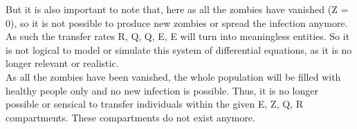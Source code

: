But it is also important to note that, here as all the zombies have vanished (Z = 0), so it is not possible to produce new zombies or spread the infection anymore. As such the transfer rates \textzeta R, \textomega Q, \textgamma Q, \textrho E, \textkappa E will turn into meaningless entities. So it is not logical to model or simulate this system of differential equations, as it is no longer relevant or realistic. \\

As all the zombies have been vanished, the whole population will be filled with healthy people only and no new infection is possible. Thus, it is no longer possible or sensical to transfer individuals within the given E, Z, Q, R compartments. These compartments do not exist anymore.




